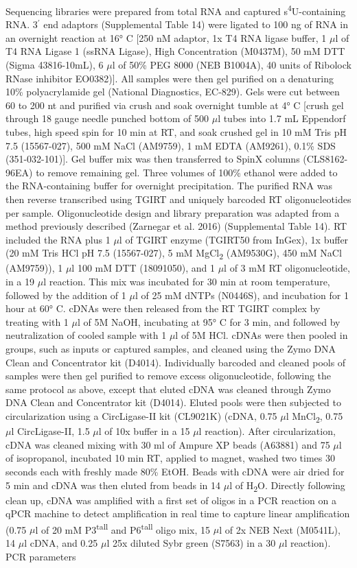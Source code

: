 \documentclass[times, twoside]{zHenriquesLab-StyleBioRxiv}
\begin{document}
Sequencing libraries were prepared from total RNA and captured s\textsuperscript{4}U-containing RNA. 3\(^{\prime}\) end adaptors (Supplemental Table 14) were ligated to 100 ng of RNA in an overnight reaction at 16° C [250 nM adaptor, 1x T4 RNA ligase buffer, 1 \(\mu\)l of T4 RNA Ligase 1 (ssRNA Ligase), High Concentration (M0437M), 50 mM DTT (Sigma 43816-10mL), 6 \(\mu\)l of 50\% PEG 8000 (NEB B1004A), 40 units of Ribolock RNase inhibitor EO0382)]. All samples were then gel purified on a denaturing 10\% polyacrylamide gel (National Diagnostics, EC-829). Gels were cut between 60 to 200 nt and purified via crush and soak overnight tumble at 4° C [crush gel through 18 gauge needle punched bottom of 500 \(\mu\)l tubes into 1.7 mL Eppendorf tubes, high speed spin for 10 min at RT, and soak crushed gel in 10 mM Tris pH 7.5 (15567-027), 500 mM NaCl (AM9759), 1 mM EDTA (AM9261), 0.1\% SDS (351-032-101)]. Gel buffer mix was then transferred to SpinX columns (CLS8162-96EA) to remove remaining gel. Three volumes of 100\% ethanol were added to the RNA-containing buffer for overnight precipitation. The purified RNA was then reverse transcribed using TGIRT and uniquely barcoded RT oligonucleotides per sample. Oligonucleotide design and library preparation was adapted from a method previously described (Zarnegar et al. 2016) (Supplemental Table 14). RT included the RNA plus 1 \(\mu\)l of TGIRT enzyme (TGIRT50 from InGex), 1x buffer (20 mM Tris HCl pH 7.5 (15567-027), 5 mM MgCl\textsubscript{2} (AM9530G), 450 mM NaCl (AM9759)), 1 \(\mu\)l 100 mM DTT (18091050), and 1 \(\mu\)l of 3 mM RT oligonucleotide, in a 19 \(\mu\)l reaction. This mix was incubated for 30 min at room temperature, followed by the addition of 1 \(\mu\)l of 25 mM dNTPs (N0446S), and incubation for 1 hour at 60° C. cDNAs were then released from the RT TGIRT complex by treating with 1 \(\mu\)l of 5M NaOH, incubating at 95° C for 3 min, and followed by neutralization of cooled sample with 1 \(\mu\)l of 5M HCl. cDNAs were then pooled in groups, such as inputs or captured samples, and cleaned using the Zymo DNA Clean and Concentrator kit (D4014). Individually barcoded and cleaned pools of samples were then gel purified to remove excess oligonucleotide, following the same protocol as above, except that eluted cDNA was cleaned through Zymo DNA Clean and Concentrator kit (D4014). Eluted pools were then subjected to circularization using a CircLigase-II kit (CL9021K) (cDNA, 0.75 \(\mu\)l MnCl\textsubscript{2}, 0.75 \(\mu\)l CircLigase-II, 1.5 \(\mu\)l of 10x buffer in a 15 \(\mu\)l reaction). After circularization, cDNA was cleaned mixing with 30 ml of Ampure XP beads (A63881) and 75 \(\mu\)l of isopropanol, incubated 10 min RT, applied to magnet, washed two times 30 seconds each with freshly made 80\% EtOH. Beads with cDNA were air dried for 5 min and cDNA was then eluted from beads in 14 \(\mu\)l of H\textsubscript{2}O. Directly following clean up, cDNA was amplified with a first set of oligos in a PCR reaction on a qPCR machine to detect amplification in real time to capture linear amplification (0.75 \(\mu\)l of 20 mM P3\textsuperscript{tall} and P6\textsuperscript{tall} oligo mix, 15 \(\mu\)l of 2x NEB Next (M0541L), 14 \(\mu\)l cDNA, and 0.25 \(\mu\)l 25x diluted Sybr green (S7563) in a 30 \(\mu\)l reaction). PCR parameters 
\end{document}

